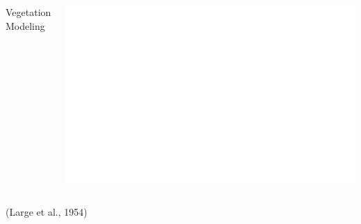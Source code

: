 \documentclass[%
  aspectratio=169,
  9pt,
  USenglish,
  titlegraphic, %
  affiliationintitlepagehead,
  affiliation,
]{beamer}
\begin{document}
{
	\begin{frame}[plain]
	
	\vfill
	\Huge\color{white}
	\begin{center}
		\begin{columns}
			\vspace{7em}
			
			\hfill 
			Vegetation Modeling
			
			\includegraphics[width=\textwidth]{images/Large1954_cerial_growth_stages_white}
		\end{columns}
		\small\raggedleft(Large et al., 1954)
	\end{center}
	
	\vfill
\end{frame}
}

\newcommand{\rastergrid}{
\begin{tikzpicture}
\begin{scope}[scale=2]

\def\d{0.7}		

\def\s{\d*5}

\foreach \i in {1,...,6}
{		
\begin{scope}[
yshift=\s*\i,every node/.append style={
	yslant=0.5,xslant=-1},yslant=0.5,xslant=-1
]

\foreach \row in {0,...,2}{
	\foreach \col in {0,...,2}{
		\draw[tumblack, fill=tumblue!\pdfuniformdeviate 40,fill opacity=1,rounded corners=1] (\col*\d/3,\row*\d/3) rectangle (\col*\d/3+\d/3, \row*\d/3+\d/3);
	}
}

\end{scope}
}
\end{scope}
\end{tikzpicture}
}
\end{document}
